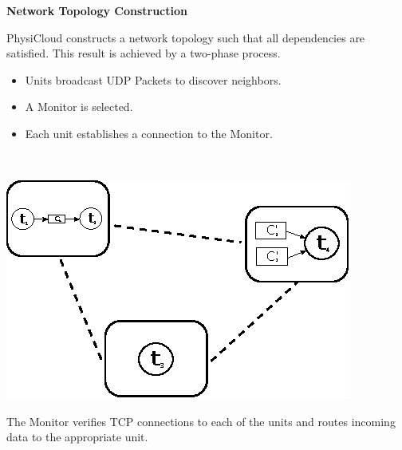 \documentclass[landscape,paperwidth=40in,paperheight=32in]{baposter}
\newcommand{\BI}{\begin{itemize}[itemsep=.03in,parsep=0in,leftmargin=.2in]}
\newcommand{\EI}{\end{itemize}}
\begin{document}
\begin{poster}
{\vspace{1em}

{\bf\large Network Topology Construction}

	\smallskip

  	\begin{minipage}[t]{0.80\linewidth}
	
		PhysiCloud constructs a network topology such that all dependencies are satisfied.  This result is achieved by a two-phase process.
		
		\smallskip
		
		\begin{minipage}{0.5\linewidth}
    			\BI
				\item Units broadcast UDP Packets to discover neighbors.
				\item A Monitor is selected.
				\item Each unit establishes a connection to the Monitor.
			\EI	
		\end{minipage}		
		~~~~~~
		\begin{minipage}{0.35\linewidth}
			    	\includegraphics[width=\linewidth]{physicloud-udp}
   	 	\end{minipage}	
    \end{minipage}

	\bigskip

  	\begin{minipage}[t]{0.80\linewidth}
	
		The Monitor verifies TCP connections to each of the units and routes incoming data to the appropriate unit.
		\bigskip
		

\end{minipage}}
\end{poster}
\end{document}
